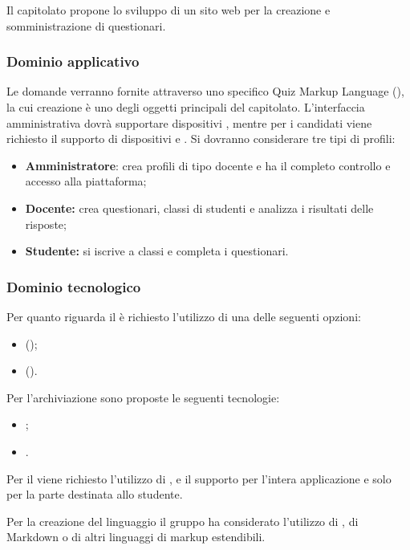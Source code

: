 \documentclass[12pt,a4paper]{article}
\begin{document}
Il capitolato propone lo sviluppo di un sito web per la creazione e somministrazione di questionari.

\subsubsection{Dominio applicativo}

Le domande verranno fornite attraverso uno specifico Quiz Markup Language (), la cui creazione è uno degli oggetti principali del capitolato. L'interfaccia amministrativa dovrà supportare dispositivi , mentre per i candidati viene richiesto il supporto di dispositivi  e . Si dovranno considerare tre tipi di profili:

\begin{itemize}
\item \textbf{Amministratore}: crea profili di tipo docente e ha il completo controllo e accesso alla piattaforma;
\item \textbf{Docente:} crea questionari, classi di studenti e analizza i risultati delle risposte;
\item \textbf{Studente:} si iscrive a classi e completa i questionari.
\end{itemize}

\subsubsection{Dominio tecnologico}

Per quanto riguarda il  è richiesto l'utilizzo di una delle seguenti opzioni:

\begin{itemize}
\item {} ();
\item {} ().
\end{itemize}
Per l'archiviazione sono proposte le seguenti tecnologie:
\begin{itemize}
\item {};
\item {}.
\end{itemize}
Per il  viene richiesto l'utilizzo di ,  e il supporto  per l'intera applicazione e  solo per la parte destinata allo studente.

Per la creazione del linguaggio  il gruppo ha considerato l'utilizzo di , di Markdown o di altri linguaggi di markup estendibili.
\end{document}
